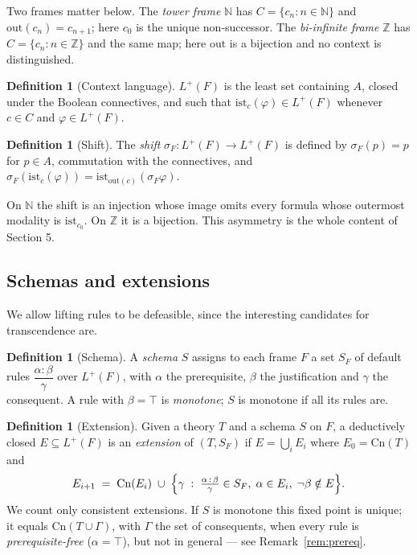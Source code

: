 \documentclass[11pt]{article}
\theoremstyle{plain}
\theoremstyle{definition}
\newtheorem{definition}[theorem]{Definition}
\theoremstyle{remark}
\newcommand{\ist}{\mathrm{ist}}
\newcommand{\Cn}{\mathrm{Cn}}
\newcommand{\out}{\mathrm{out}}
\newcommand{\Lp}{L^{+}}
\begin{document}
Two frames matter below. The \emph{tower frame} $\mathbb{N}$ has
$C=\{c_n : n \in \mathbb{N}\}$ and $\out(c_n)=c_{n+1}$; here $c_0$ is the unique
non-successor. The \emph{bi-infinite frame} $\mathbb{Z}$ has $C=\{c_n : n \in
\mathbb{Z}\}$ and the same map; here $\out$ is a bijection and no context is
distinguished.

\begin{definition}[Context language]
$\Lp(F)$ is the least set containing $A$, closed under the Boolean connectives,
and such that $\ist_c(\varphi) \in \Lp(F)$ whenever $c \in C$ and
$\varphi \in \Lp(F)$.
\end{definition}

\begin{definition}[Shift]
The \emph{shift} $\sigma_F \colon \Lp(F)\to\Lp(F)$ is defined by
$\sigma_F(p)=p$ for $p \in A$, commutation with the connectives, and
$\sigma_F(\ist_c(\varphi)) = \ist_{\out(c)}(\sigma_F \varphi)$.
\end{definition}

On $\mathbb{N}$ the shift is an injection whose image omits every formula whose
outermost modality is $\ist_{c_0}$. On $\mathbb{Z}$ it is a bijection. This
asymmetry is the whole content of Section 5.

\subsection{Schemas and extensions}

We allow lifting rules to be defeasible, since the interesting candidates for
transcendence are.

\begin{definition}[Schema]
A \emph{schema} $S$ assigns to each frame $F$ a set $S_F$ of default rules
$\dfrac{\alpha : \beta}{\gamma}$ over $\Lp(F)$, with $\alpha$ the prerequisite,
$\beta$ the justification and $\gamma$ the consequent. A rule with
$\beta = \top$ is \emph{monotone}; $S$ is monotone if all its rules are.
\end{definition}

\begin{definition}[Extension]\label{def:extension}
Given a theory $T$ and a schema $S$ on $F$, a deductively closed
$E \subseteq \Lp(F)$ is an \emph{extension} of $(T,S_F)$ if $E = \bigcup_{i}E_i$
where $E_0 = \Cn(T)$ and
\[
E_{i+1} \;=\; \Cn(E_i) \;\cup\;
\Bigl\{\gamma \;:\; \tfrac{\alpha\,:\,\beta}{\gamma}\in S_F,\;
\alpha \in E_i,\; \neg\beta \notin E \Bigr\}.
\]
We count only consistent extensions. If $S$ is monotone this fixed point is
unique; it equals $\Cn(T\cup\Gamma)$, with $\Gamma$ the set of consequents,
when every rule is \emph{prerequisite-free} ($\alpha=\top$), but not in
general --- see Remark~\ref{rem:prereq}.
\end{definition}
\end{document}
